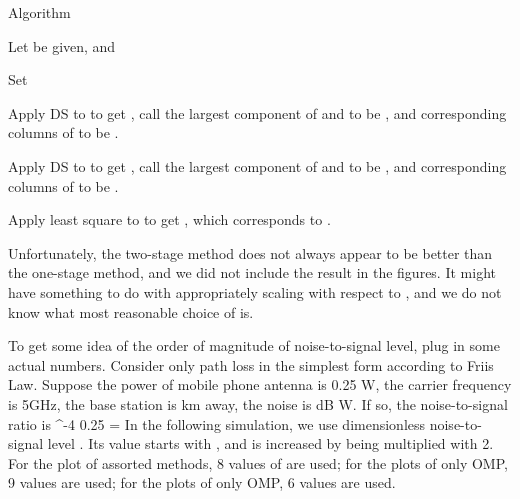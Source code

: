 \Result
{Algorithm}
{
\startitemize[n]
\item Let  be given, and 

\item Set

\item Apply DS to  to get , call the  largest component of  and to be , and corresponding columns of  to be .

\item Apply DS to  to get , call the  largest component of  and to be , and corresponding columns of  to be .

\item Apply least square to  to get , which corresponds to .
\stopitemize
}

Unfortunately, the two-stage method does not always appear to be better than the one-stage method, and we did not include the result in the figures.
It might have something to do with appropriately scaling  with respect to ,
and we do not know what most reasonable choice of  is.

\stopsubsection

\startsection [title={Result}]

\startsubsection [title={Settings}]

To get some idea of the order of magnitude of noise-to-signal level, plug in some actual numbers.
Consider only path loss in the simplest form according to Friis Law.
Suppose the power of mobile phone antenna is 0.25 W,
the carrier frequency is 5GHz,
the base station is  km away,
the noise is  dB W.
If so, the noise-to-signal ratio is
 {
^{-4}  {0.25} 
= \NR
}
In the following simulation, we use dimensionless noise-to-signal level \m {\s}.
Its value starts with , and is increased by being multiplied with 2.
For the plot of assorted methods, 8 values of \m {\s} are used; for the plots of only OMP, 9 values are used; for the plots of only OMP, 6 values are used.

